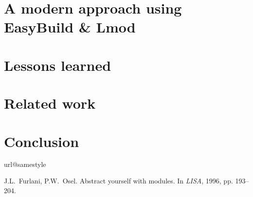 \documentclass[conference, compsocconf]{IEEEtran}
\newcommand{\easybuild}{EasyBuild}
\begin{document}
\section{A modern approach using \easybuild{} \& Lmod}
\label{sec:modern}


\section{Lessons learned}
\label{sec:lessons}


\section{Related work}
\label{sec:related_work}


\section{Conclusion}
\label{sec:conclusion}


\footnotesize
%
%

\begin{thebibliography}{10}
\providecommand{\url}[1]{#1}
\csname url@samestyle\endcsname
\providecommand{\newblock}{\relax}
\providecommand{\bibinfo}[2]{#2}
\providecommand{\BIBentrySTDinterwordspacing}{\spaceskip=0pt\relax}
\providecommand{\BIBentryALTinterwordstretchfactor}{4}
\providecommand{\BIBentryALTinterwordspacing}{\spaceskip=\fontdimen2\font plus
\BIBentryALTinterwordstretchfactor\fontdimen3\font minus
  \fontdimen4\font\relax}
\providecommand{\BIBforeignlanguage}[2]{{%
\expandafter\ifx\csname l@#1\endcsname\relax
\typeout{** WARNING: IEEEtran.bst: No hyphenation pattern has been}%
\typeout{** loaded for the language `#1'. Using the pattern for}%
\typeout{** the default language instead.}%
\else
\language=\csname l@#1\endcsname
\fi
#2}}
\providecommand{\BIBdecl}{\relax}
\BIBdecl

J.L.~Furlani, P.W.~Osel.
\newblock Abstract yourself with modules.
\newblock In \textit{LISA}, 1996, pp. 193--204.


\end{thebibliography}
\end{document}
